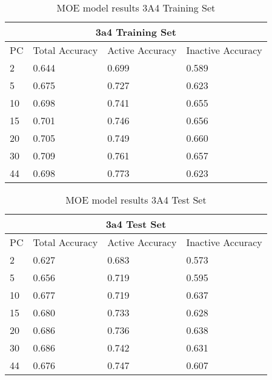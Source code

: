\begin{table}[h]
\begin{tabular}{|l|l|l|l|}
\hline
\multicolumn{4}{|c|}{3a4 Training Set}                                                                \\ \hline
PC & Total Accuracy & Active Accuracy & Inactive Accuracy \\ \hline
2  & 0.644          & 0.699           & 0.589   \\ \hline
5  & 0.675          & 0.727           & 0.623   \\ \hline
10 & 0.698          & 0.741           & 0.655   \\ \hline
15 & 0.701          & 0.746           & 0.656   \\ \hline
20 & 0.705          & 0.749           & 0.660   \\ \hline
30 & 0.709          & 0.761           & 0.657   \\ \hline
44 & 0.698          & 0.773           & 0.623   \\ \hline
\end{tabular}
\caption{MOE model results 3A4 Training Set}
\end{table}


\begin{table}[h]
\begin{tabular}{|l|l|l|l|}
\hline
\multicolumn{4}{|c|}{3a4 Test Set}                                                                    \\ \hline
PC & Total Accuracy & Active Accuracy & Inactive Accuracy  \\ \hline
2  & 0.627          & 0.683           & 0.573    \\ \hline
5  & 0.656          & 0.719           & 0.595    \\ \hline
10 & 0.677          & 0.719           & 0.637    \\ \hline
15 & 0.680          & 0.733           & 0.628    \\ \hline
20 & 0.686          & 0.736           & 0.638    \\ \hline
30 & 0.686          & 0.742           & 0.631    \\ \hline
44 & 0.676          & 0.747           & 0.607    \\ \hline
\end{tabular}
\caption{MOE model results 3A4 Test Set}
\end{table}


